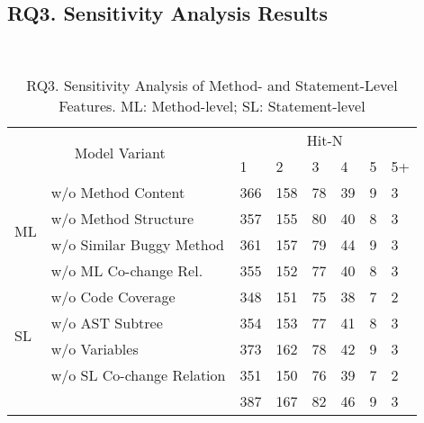 \subsection{\bf RQ3. Sensitivity Analysis Results}~\label{sensi}


\begin{table}[t]
	\caption{RQ3. Sensitivity Analysis of Method- and Statement-Level Features. ML: Method-level; SL: Statement-level}
        \vspace{-6pt}
	{\small
		\begin{center}
			\renewcommand{\arraystretch}{1}
			\begin{tabular}{p{0.3cm}<{\centering}|p{3cm}|p{0.3cm}<{\centering}|p{0.3cm}<{\centering}|p{0.2cm}<{\centering}|p{0.2cm}<{\centering}|p{0.15cm}<{\centering}|p{0.15cm}<{\centering}}
				\hline
				\multicolumn{2}{c|}{\multirow{2}{*}{Model Variant}}    & \multicolumn{6}{c}{Hit-N}\\
				\cline{3-8}
				                 \multicolumn{2}{c|}{}   &1&2&3&4&5&5+\\
				
				\hline 
				\multirow{4}{*}{ML}&w/o Method Content              & 366 & 158 & 78  & 39 & 9 & 3   \\\cline{2-8}
				&w/o	Method Structure	                        & 357 & 155 & 80  & 40 & 8 & 3   \\ \cline{2-8}
				&w/o Similar Buggy Method    	& 361 & 157 & 79  & 44 & 9 & 3   \\ \cline{2-8}
				&w/o ML Co-change Rel.         & 355 & 152 & 77  & 40 & 8 &  3   \\ \cline{2-8}
				\hline
				\multirow{4}{*}{SL}&w/o Code Coverage               & 348 & 151 & 75  & 38 & 7 & 2   \\\cline{2-8}
				&w/o	AST Subtree	        & 354 & 153 & 77  & 41 & 8 & 3   \\ \cline{2-8}
				&w/o Variables               	& 373 & 162 & 78  & 42 & 9 & 3   \\ \cline{2-8}
				&w/o SL Co-change Relation       & 351 & 150 & 76 & 39 & 7 &  2   \\ \cline{2-8}
				\hline
			&	{\tool}                           & 387 & 167 & 82  & 46 & 9 & 3  \\ \cline{2-8}
				\hline
			\end{tabular}
			
			\label{fig:rq3-1}
		\end{center}
	}
\end{table}

